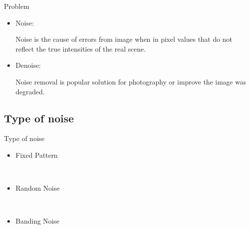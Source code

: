 \documentclass{beamer}
\begin{document}
\begin{frame}{Problem}



\begin{itemize}



\item Noise:

Noise is the cause of errors from image when in pixel values that do not reflect the true intensities of the
real scene.

\vspace{7mm}

\item Denoise:

Noise removal is popular solution for photography or improve the image was degraded.


\end{itemize}






\end{frame}

\subsection{Type of noise}

\begin{frame}{Type of noise}


\begin{itemize}
	\item Fixed Pattern
	

	
	\
	
	\item  Random Noise
	
	
	\
	
	\item Banding Noise
	
\end{itemize}

\end{frame}
\end{document}
